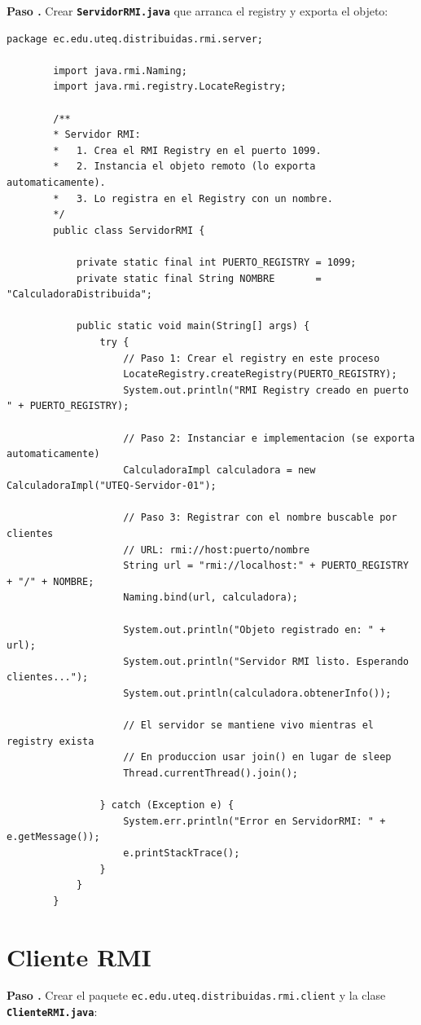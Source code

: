 \documentclass[12pt, a4paper, openany]{book}
\newcounter{paso}[section]
\newcommand{\paso}[1]{%
	\stepcounter{paso}%
	\medskip\noindent
	\begin{tcolorbox}[enhanced, colback=white, colframe=practiceBlue,
		boxrule=0.8pt, arc=3pt, left=6pt, right=6pt, top=4pt, bottom=4pt,
		before upper={\noindent}]
		\textcolor{practiceBlue}{\textbf{Paso \arabic{paso}.}} #1
	\end{tcolorbox}%
}
\newcommand{\code}[1]{\texttt{\small#1}}
\newcommand{\archivo}[1]{\texttt{\textbf{#1}}}
\begin{document}
	\paso{Crear \archivo{ServidorRMI.java} que arranca el registry y exporta el objeto:}
	
	\begin{lstlisting}[style=JavaStyle, caption={ServidorRMI.java --- Servidor que registra el objeto remoto}]
		package ec.edu.uteq.distribuidas.rmi.server;
		
		import java.rmi.Naming;
		import java.rmi.registry.LocateRegistry;
		
		/**
		* Servidor RMI:
		*   1. Crea el RMI Registry en el puerto 1099.
		*   2. Instancia el objeto remoto (lo exporta automaticamente).
		*   3. Lo registra en el Registry con un nombre.
		*/
		public class ServidorRMI {
			
			private static final int PUERTO_REGISTRY = 1099;
			private static final String NOMBRE       = "CalculadoraDistribuida";
			
			public static void main(String[] args) {
				try {
					// Paso 1: Crear el registry en este proceso
					LocateRegistry.createRegistry(PUERTO_REGISTRY);
					System.out.println("RMI Registry creado en puerto " + PUERTO_REGISTRY);
					
					// Paso 2: Instanciar e implementacion (se exporta automaticamente)
					CalculadoraImpl calculadora = new CalculadoraImpl("UTEQ-Servidor-01");
					
					// Paso 3: Registrar con el nombre buscable por clientes
					// URL: rmi://host:puerto/nombre
					String url = "rmi://localhost:" + PUERTO_REGISTRY + "/" + NOMBRE;
					Naming.bind(url, calculadora);
					
					System.out.println("Objeto registrado en: " + url);
					System.out.println("Servidor RMI listo. Esperando clientes...");
					System.out.println(calculadora.obtenerInfo());
					
					// El servidor se mantiene vivo mientras el registry exista
					// En produccion usar join() en lugar de sleep
					Thread.currentThread().join();
					
				} catch (Exception e) {
					System.err.println("Error en ServidorRMI: " + e.getMessage());
					e.printStackTrace();
				}
			}
		}
	\end{lstlisting}
	
	\section{Cliente RMI}
	
	\paso{Crear el paquete \code{ec.edu.uteq.distribuidas.rmi.client} y
		la clase \archivo{ClienteRMI.java}:}
	
\end{document}
